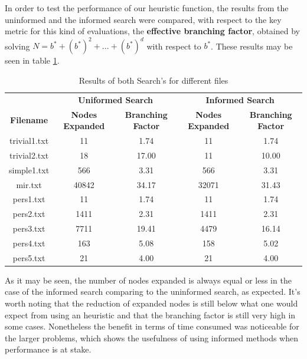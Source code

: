 \documentclass[11pt,a4paper,oneside]{article}
\begin{document}
In order to test the performance of our heuristic function, the results from the uninformed and the informed search were compared, with respect to the key metric for this kind of evaluations, the \textbf{effective branching factor}, obtained by solving $N = b^* + (b^*)^2 +...+ (b^*)^d$ with respect to $b^*$. These results may be seen in table \ref{table:1}.


\begin{table}[H]
\centering
\caption{Results of both Search's for different files}
\label{table:1}
\begin{tabular}{ccccc}
 & \multicolumn{2}{c}{\large\textbf{Uniformed  Search}} & \multicolumn{2}{c}{\large\textbf{Informed  Search}} \\
\textbf{Filename} & \textbf{Nodes Expanded} & \textbf{Branching Factor} & \textbf{Nodes Expanded} & \textbf{Branching Factor} \\
trivial1.txt & 11 & 1.74 & 11 & 1.74 \\
trivial2.txt & 18 & 17.00 & 11 & 10.00 \\
simple1.txt & 566 & 3.31 & 566 & 3.31 \\
mir.txt & 40842 & 34.17 & 32071 & 31.43 \\
pers1.txt & 11 & 1.74 & 11 & 1.74 \\
pers2.txt & 1411 & 2.31 & 1411 & 2.31 \\
pers3.txt & 7711 & 19.41 & 4479 & 16.14 \\
pers4.txt & 163 & 5.08 & 158 & 5.02 \\
pers5.txt & 21 & 4.00 & 21 & 4.00
\end{tabular}
\end{table}

As it may be seen, the number of nodes expanded is always equal or less in the case of the informed search comparing to the uninformed search, as expected. It's worth noting that the reduction of expanded nodes is still below what one would expect from using an heuristic and that the branching factor is still very high in some cases. Nonetheless the benefit in terms of time consumed was noticeable for the larger problems, which shows the usefulness of using informed methods when performance is at stake.
\end{document}
